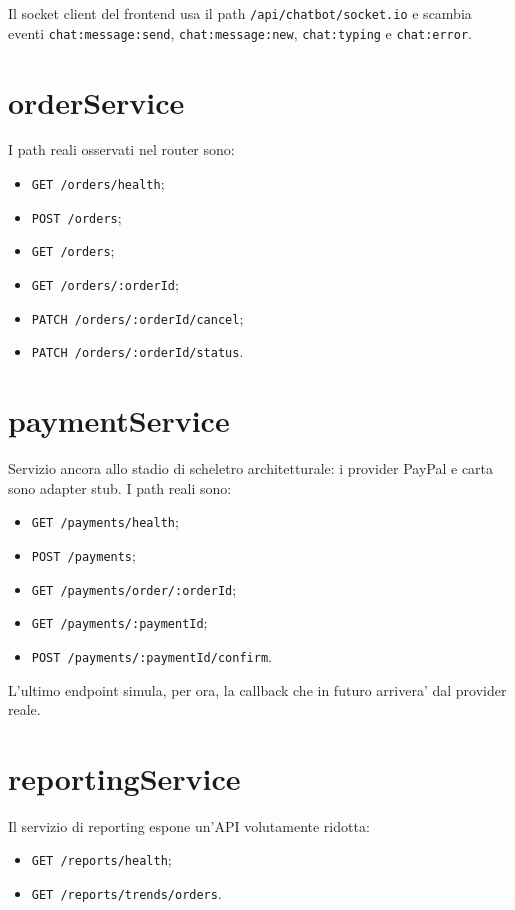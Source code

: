 Il socket client del frontend usa il path \texttt{/api/chatbot/socket.io} e scambia eventi \texttt{chat:message:send}, \texttt{chat:message:new}, \texttt{chat:typing} e \texttt{chat:error}.

\section{orderService}

I path reali osservati nel router sono:

\begin{itemize}
\item \texttt{GET /orders/health};
\item \texttt{POST /orders};
\item \texttt{GET /orders};
\item \texttt{GET /orders/:orderId};
\item \texttt{PATCH /orders/:orderId/cancel};
\item \texttt{PATCH /orders/:orderId/status}.
\end{itemize}

\section{paymentService}

Servizio ancora allo stadio di scheletro architetturale: i provider PayPal e carta sono adapter stub. I path reali sono:

\begin{itemize}
\item \texttt{GET /payments/health};
\item \texttt{POST /payments};
\item \texttt{GET /payments/order/:orderId};
\item \texttt{GET /payments/:paymentId};
\item \texttt{POST /payments/:paymentId/confirm}.
\end{itemize}

L'ultimo endpoint simula, per ora, la callback che in futuro arrivera' dal provider reale.

\section{reportingService}

Il servizio di reporting espone un'API volutamente ridotta:

\begin{itemize}
\item \texttt{GET /reports/health};
\item \texttt{GET /reports/trends/orders}.
\end{itemize}

